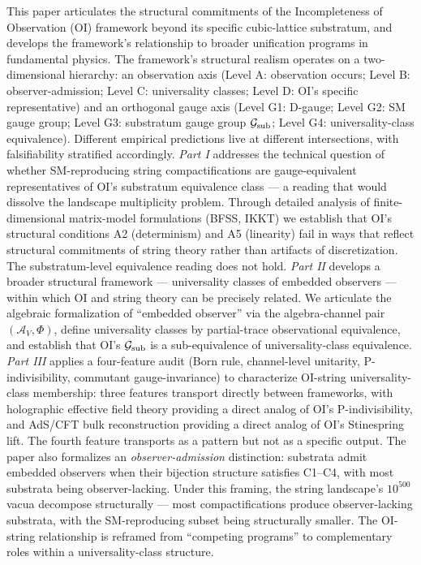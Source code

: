 \documentclass[
]{article}
\begin{document}
This paper articulates the structural commitments of the Incompleteness
of Observation (OI) framework beyond its specific cubic-lattice
substratum, and develops the framework's relationship to broader
unification programs in fundamental physics. The framework's structural
realism operates on a two-dimensional hierarchy: an observation axis
(Level A: observation occurs; Level B: observer-admission; Level C:
universality classes; Level D: OI's specific representative) and an
orthogonal gauge axis (Level G1: D-gauge; Level G2: SM gauge group;
Level G3: substratum gauge group \(\mathcal{G}_{\rm sub}\); Level G4:
universality-class equivalence). Different empirical predictions live at
different intersections, with falsifiability stratified accordingly.
\emph{Part I} addresses the technical question of whether SM-reproducing
string compactifications are gauge-equivalent representatives of OI's
substratum equivalence class --- a reading that would dissolve the
landscape multiplicity problem. Through detailed analysis of
finite-dimensional matrix-model formulations (BFSS, IKKT) we establish
that OI's structural conditions A2 (determinism) and A5 (linearity) fail
in ways that reflect structural commitments of string theory rather than
artifacts of discretization. The substratum-level equivalence reading
does not hold. \emph{Part II} develops a broader structural framework
--- universality classes of embedded observers --- within which OI and
string theory can be precisely related. We articulate the algebraic
formalization of ``embedded observer'' via the algebra-channel pair
\((\mathcal{A}_V, \Phi)\), define universality classes by partial-trace
observational equivalence, and establish that OI's
\(\mathcal{G}_{\rm sub}\) is a sub-equivalence of universality-class
equivalence. \emph{Part III} applies a four-feature audit (Born rule,
channel-level unitarity, P-indivisibility, commutant gauge-invariance)
to characterize OI-string universality-class membership: three features
transport directly between frameworks, with holographic effective field
theory providing a direct analog of OI's P-indivisibility, and AdS/CFT
bulk reconstruction providing a direct analog of OI's Stinespring lift.
The fourth feature transports as a pattern but not as a specific output.
The paper also formalizes an \emph{observer-admission} distinction:
substrata admit embedded observers when their bijection structure
satisfies C1--C4, with most substrata being observer-lacking. Under this
framing, the string landscape's \(10^{500}\) vacua decompose
structurally --- most compactifications produce observer-lacking
substrata, with the SM-reproducing subset being structurally smaller.
The OI-string relationship is reframed from ``competing programs'' to
complementary roles within a universality-class structure.
\end{document}
